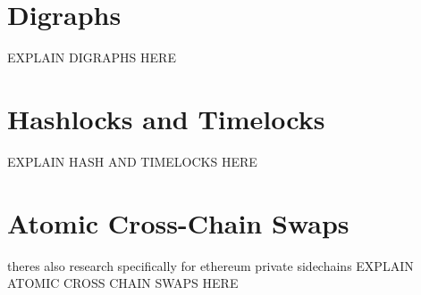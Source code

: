 %
%
\section{Digraphs}
\label{sec:background:second_section}
EXPLAIN DIGRAPHS HERE
\cite{bang2007theory}

\section{Hashlocks and Timelocks}
\label{sec:background:third_section}
EXPLAIN HASH AND TIMELOCKS HERE


\section{Atomic Cross-Chain Swaps}
\label{sec:background:fifth_section}

theres also research specifically for ethereum private sidechains \cite{robinson2019atomic}
EXPLAIN ATOMIC CROSS CHAIN SWAPS HERE
\cite{herlihy2018atomic}